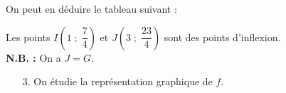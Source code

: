 \vspace*{.3cm}

On peut en déduire le tableau suivant : \\


\vspace*{.3cm}

Les points $I\left(1 \; ; \; \dfrac{7}{4}\right)$ et $J\left(3 \; ; \; \dfrac{23}{4}\right)$ sont des points d'inflexion. \\

\textbf{N.B. :} On a $J = G$.

\newpage

\begin{itemize}
\item[3.] On étudie la représentation graphique de $f$. \\
\end{itemize}


